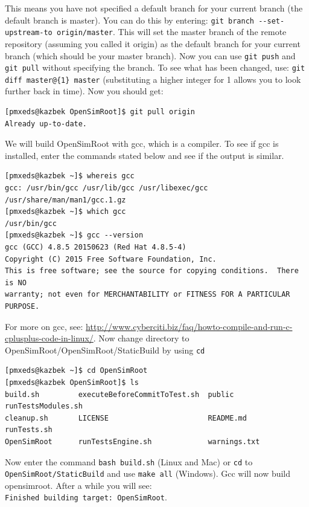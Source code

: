 \documentclass{article}
\begin{document}
\noindent This means you have not specified a default branch for your current branch (the default branch is master). You can do this by entering: \verb|git branch --set-upstream-to origin/master|. This will set the master branch of the remote repository (assuming you called it origin) as the default branch for your current branch (which should be your master branch). Now you can use \verb|git push| and \verb|git pull| without specifying the branch. To see what has been changed, use: \verb|git diff master@{1} master| (substituting a higher integer for 1 allows you to look further back in time). Now you should get:

\begin{verbatim}
[pmxeds@kazbek OpenSimRoot]$ git pull origin
Already up-to-date.
\end{verbatim}

\noindent We will build OpenSimRoot with gcc, which is a compiler. To see if gcc is installed, enter the commands stated below and see if the output is similar.
\begin{verbatim}
[pmxeds@kazbek ~]$ whereis gcc
gcc: /usr/bin/gcc /usr/lib/gcc /usr/libexec/gcc /usr/share/man/man1/gcc.1.gz
[pmxeds@kazbek ~]$ which gcc
/usr/bin/gcc
[pmxeds@kazbek ~]$ gcc --version
gcc (GCC) 4.8.5 20150623 (Red Hat 4.8.5-4)
Copyright (C) 2015 Free Software Foundation, Inc.
This is free software; see the source for copying conditions.  There is NO
warranty; not even for MERCHANTABILITY or FITNESS FOR A PARTICULAR PURPOSE.
\end{verbatim}

\noindent For more on gcc, see: \url{http://www.cyberciti.biz/faq/howto-compile-and-run-c-cplusplus-code-in-linux/}. Now change directory to OpenSimRoot/OpenSimRoot/StaticBuild by using \verb|cd|

\begin{verbatim}
[pmxeds@kazbek ~]$ cd OpenSimRoot
[pmxeds@kazbek OpenSimRoot]$ ls
build.sh         executeBeforeCommitToTest.sh  public             runTestsModules.sh
cleanup.sh       LICENSE                       README.md          runTests.sh
OpenSimRoot      runTestsEngine.sh             warnings.txt
\end{verbatim}

\noindent Now enter the command \verb|bash build.sh| (Linux and Mac) or \verb|cd| to \verb|OpenSimRoot/StaticBuild| and use \verb|make all| (Windows). Gcc will now build opensimroot. After a while you will see: \\ \verb|Finished building target: OpenSimRoot|. \\
\end{document}
